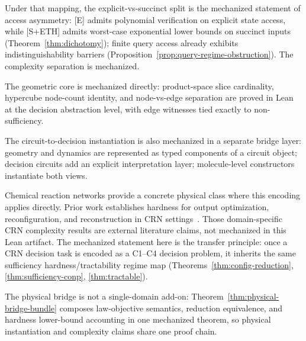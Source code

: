 Under that mapping, the explicit-vs-succinct split is the mechanized statement of access asymmetry: [E] admits polynomial verification on explicit state access, while [S+ETH] admits worst-case exponential lower bounds on succinct inputs (Theorem~\ref{thm:dichotomy}); finite query access already exhibits indistinguishability barriers (Proposition~\ref{prop:query-regime-obstruction}). The complexity separation is mechanized.

The geometric core is mechanized directly: product-space slice cardinality, hypercube node-count identity, and node-vs-edge separation are proved in Lean at the decision abstraction level, with edge witnesses tied exactly to non-sufficiency.

The circuit-to-decision instantiation is also mechanized in a separate bridge layer: geometry and dynamics are represented as typed components of a circuit object; decision circuits add an explicit interpretation layer; molecule-level constructors instantiate both views.

Chemical reaction networks provide a concrete physical class where this encoding applies directly. Prior work establishes hardness for output optimization, reconfiguration, and reconstruction in CRN settings~\cite{andersen2012maximizing,alaniz2023complexity,flamml2013complexity}. Those domain-specific CRN complexity results are external literature claims, not mechanized in this Lean artifact. The mechanized statement here is the transfer principle: once a CRN decision task is encoded as a C1--C4 decision problem, it inherits the same sufficiency hardness/tractability regime map (Theorems~\ref{thm:config-reduction}, \ref{thm:sufficiency-conp}, \ref{thm:tractable}).

The physical bridge is not a single-domain add-on: Theorem~\ref{thm:physical-bridge-bundle} composes law-objective semantics, reduction equivalence, and hardness lower-bound accounting in one mechanized theorem, so physical instantiation and complexity claims share one proof chain.

